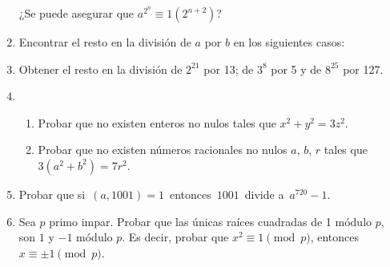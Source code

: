 \documentclass[a4paper,12pt,twoside,spanish,reqno]{amsbook}
\numberwithin{equation}{section}
\begin{document}
\begin{enumerate}
    ¿Se puede asegurar que $a^{2^n} \equiv 1 (2^{n+2})$?


\item Encontrar el resto en la división de $a$ por $b$ en los siguientes casos:


\item Obtener el resto en la división de $2^{21}$ por 13; de $3^8$ por 5 y de  $8^{25}$ por 127.



%


\item 
    \begin{enumerate}
        \item Probar que no existen enteros no nulos tales que $x^2 + y^2 = 3z^2$.
        \item Probar que no existen números racionales no nulos $a$, $b$, $r$ tales que $3(a^2 + b^2) = 7r^2$.
    \end{enumerate}



\item Probar que si \,$(a,1001)=1$\, entonces \,$1001$\, divide a \,$a^{720}-1$.

\item\label{ej-raiz-de-1-mod-p} Sea $p$ primo impar.  Probar que las únicas raíces cuadradas de 1 módulo $p$,  son $1$ y $-1$ módulo $p$. Es decir, probar que $x^2 \equiv 1 \pmod{p}$, entonces  $x \equiv \pm1 \pmod{p}$.

\end{enumerate}
\end{document}

